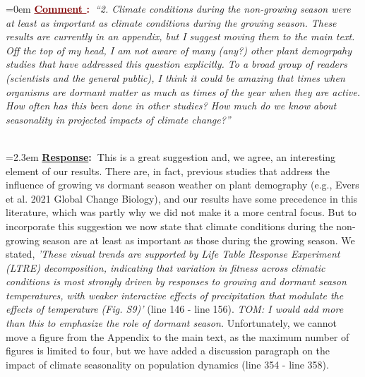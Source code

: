 \documentclass[12pt]{article}
\newcounter{cN}
\newcommand{\comment}[1]{
	\vspace{2em}
	\refstepcounter{cN} %
	\noindent \hangindent=0em \textbf{\textcolor{Maroon}{\uline{Comment \thecN}:~}}\emph{``#1''}
	}
\newcommand{\response}[1]{
	\\[0.25em]
	\hangindent=2.3em \textbf{\textcolor{NavyBlue}{\uline{Response}:~}}#1
	}
\begin{document}
\comment{2. Climate conditions during the non-growing season were at least as important as climate conditions during the growing season. These results are currently in an appendix, but I suggest moving them to the main text. Off the top of my head, I am not aware of many (any?) other plant demogrpahy studies that have addressed this question explicitly. To a broad group of readers (scientists and the general public), I think it could be amazing that times when organisms are dormant matter as much as times of the year when they are active. How often has this been done in other studies? How much do we know about seasonality in projected impacts of climate change?}
\response{This is a great suggestion and, we agree, an interesting element of our results. There are, in fact, previous studies that address the influence of growing vs dormant season weather on plant demography (e.g., Evers et al. 2021 Global Change Biology), and our results have some precedence in this literature, which was partly why we did not make it a more central focus. 
But to incorporate this suggestion we now state that climate conditions during the non-growing season are at least as important as those during the growing season. We stated, \emph{'These visual trends are supported by Life Table Response Experiment (LTRE) decomposition, indicating that variation in fitness across climatic conditions is most strongly driven by responses to growing and dormant season temperatures, with weaker interactive effects of precipitation that modulate the effects of temperature (Fig. S9)'} (line 146 - line 156).
\textit{TOM: I would add more than this to emphasize the role of dormant season.} Unfortunately, we cannot move a figure from the Appendix to the main text, as the maximum number of figures is limited to four, but we have added a discussion paragraph on the impact of climate seasonality on population dynamics (line 354 - line 358).}
\end{document}
